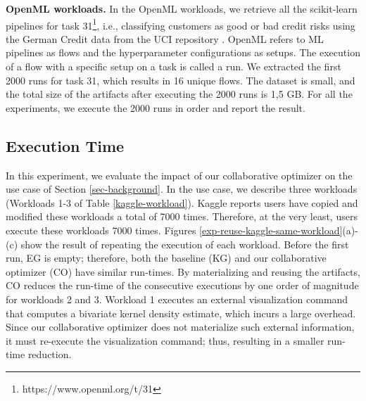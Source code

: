 \textbf{OpenML workloads.} In the OpenML workloads, we retrieve all the scikit-learn pipelines for task 31\footnote{https://www.openml.org/t/31}, i.e., classifying customers as good or bad credit risks using the German Credit data from the UCI repository \cite{asuncion2007uci}.
OpenML refers to ML pipelines as flows and the hyperparameter configurations as setups.
The execution of a flow with a specific setup on a task is called a run.
We extracted the first 2000 runs for task 31, which results in 16 unique flows. 
The dataset is small, and the total size of the artifacts after executing the 2000 runs is 1,5 GB.
For all the experiments, we execute the 2000 runs in order and report the result.

\subsection{Execution Time}
In this experiment, we evaluate the impact of our collaborative optimizer on the use case of Section \ref{sec-background}.
In the use case, we describe three workloads (Workloads 1-3 of Table \ref{kaggle-workload}).
Kaggle reports users have copied and modified these workloads a total of 7000 times.
Therefore, at the very least, users execute these workloads 7000 times.
Figures \ref{exp-reuse-kaggle-same-workload}(a)-(c) show the result of repeating the execution of each workload.
Before the first run, EG is empty; therefore, both the baseline (KG) and our collaborative optimizer (CO) have similar run-times.
By materializing and reusing the artifacts, CO reduces the run-time of the consecutive executions by one order of magnitude for workloads 2 and 3.
Workload 1 executes an external visualization command that computes a bivariate kernel density estimate, which incurs a large overhead.
Since our collaborative optimizer does not materialize such external information, it must re-execute the visualization command; thus, resulting in a smaller run-time reduction.
